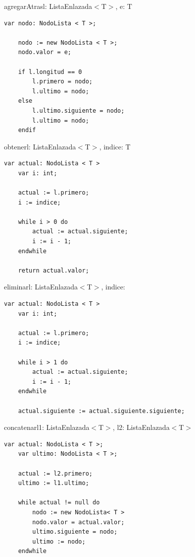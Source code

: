 {
\newcommand{\moduletype}{ListaEnlazada$<$T$>$}
\newcommand{\node}{\text{NodoLista$<$T$>$}}
\begin{proc}{agregarAtras}{\Inout l: \moduletype, \In e: T}{}
	\begin{lstlisting}[numbers=none,frame=none]
	var nodo: NodoLista < T >;
	
	nodo := new NodoLista < T >;
	nodo.valor = e;

	if l.longitud == 0
		l.primero = nodo;
		l.ultimo = nodo;
	else
		l.ultimo.siguiente = nodo;
		l.ultimo = nodo;
	endif
	\end{lstlisting}
\end{proc}

\begin{proc}{obtener}{\In l: \moduletype, \In indice: \Int}{T}
	\begin{lstlisting}[numbers=none,frame=none]
	var actual: NodoLista < T >
	var i: int;

	actual := l.primero;
	i := indice;

	while i > 0 do
		actual := actual.siguiente;
		i := i - 1;
	endwhile

	return actual.valor;
		\end{lstlisting}
\end{proc}

\pagebreak

\begin{proc}{eliminar}{\Inout l: \moduletype, \In indice: \Int}{}
	\begin{lstlisting}[numbers=none,frame=none]
	var actual: NodoLista < T >
	var i: int;
	
	actual := l.primero;
	i := indice;

	while i > 1 do
		actual := actual.siguiente;
		i := i - 1;
	endwhile

	actual.siguiente := actual.siguiente.siguiente;
	\end{lstlisting}
\end{proc}

\begin{proc}{concatenar}{\Inout l1: \moduletype, \In l2: \moduletype}{}

	\begin{lstlisting}[numbers=none,frame=none]
	var actual: NodoLista < T >;
	var ultimo: NodoLista < T >;
	
	actual := l2.primero;
	ultimo := l1.ultimo;

	while actual != null do
		nodo := new NodoLista< T >
		nodo.valor = actual.valor;
		ultimo.siguiente = nodo;
		ultimo := nodo;
	endwhile
	\end{lstlisting}
\end{proc}

}
